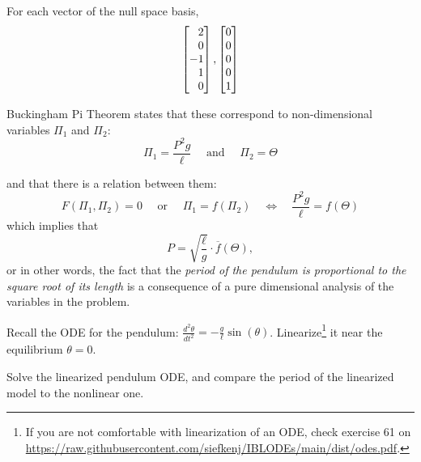 \documentclass{workbook}
\begin{document}
\begin{slide}

For each vector of the null space basis, 
\[ \mat{2\\0\\-1\\1\\0} , \mat{0\\0\\0\\0\\1} \]

Buckingham Pi Theorem states that these correspond to non-dimensional variables $\Pi_1$ and $\Pi_2$:
\[ \Pi_1 = \frac{P^2 g}{\ell} \quad \text{ and } \quad \Pi_2 = \Theta \]

and that there is a relation between them:
\[
F(\Pi_1,\Pi_2)=0 \quad \text{ or } \quad \Pi_1 = f(\Pi_2) \quad \Leftrightarrow \quad \frac{P^2 g}{\ell} = f(\Theta)
\]
which implies that
\[ 
P = \sqrt{\frac{\ell}{g}} \cdot \overline{f}(\Theta),
\]
or in other words, the fact that the \textit{period of the pendulum is proportional to the square root of its length} is a consequence of a pure dimensional analysis of the variables in the problem.


\begin{parts}
	\setcounter{partsitem}{5}
	\item Recall the ODE for the pendulum: $ \frac{d^2\theta}{dt^2} = -\frac{g}{\ell}\sin (\theta)$. Linearize\footnote{If you are not comfortable with linearization of an ODE, check exercise 61 on \url{https://raw.githubusercontent.com/siefkenj/IBLODEs/main/dist/odes.pdf}.} it near the equilibrium $\theta=0$.
	\item Solve the linearized pendulum ODE, and compare the period of the linearized model to the nonlinear one.
\end{parts}


\end{slide}
\end{document}
